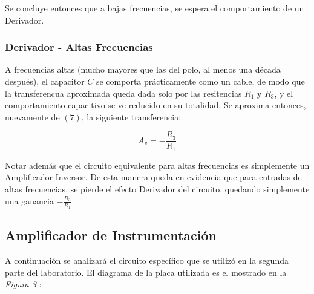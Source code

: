 \documentclass[letterpaper, 10 pt, conference]{ieeeconf}  %
\begin{document}
Se concluye entonces que a bajas frecuencias, se espera el comportamiento de un Derivador.\\

\subsubsection{Derivador - Altas Frecuencias}

A frecuencias altas (mucho mayores que las del polo, al menos una década después), el capacitor $C$ se comporta prácticamente como un cable, de modo que la transferencua aproximada queda dada solo por las resitencias $R_1$ y $R_3$, y el comportamiento capacitivo se ve reducido en su totalidad.
Se aproxima entonces, nuevamente de $(7)$, la siguiente transferencia:

            \begin{equation}
            A_v =- \frac{R_3}{R_1}
            \end{equation}
            
Notar además que el circuito equivalente para altas frecuencias es simplemente un Amplificador Inversor.
De esta manera queda en evidencia que para entradas de altas frecuencias, se pierde el efecto Derivador del circuito, quedando simplemente una ganancia $- \frac{R_3}{R_1}$

\subsection{Amplificador de Instrumentación}
A continuación se analizará el circuito específico que se utilizó en la segunda parte del laboratorio. El diagrama de la placa utilizada es el mostrado en la \textit{Figura 3} :
\end{document}
